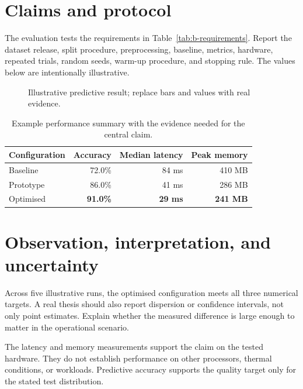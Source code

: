\section{Claims and protocol}
The evaluation tests the requirements in Table~\ref{tab:b-requirements}. Report the dataset release, split procedure, preprocessing, baseline, metrics, hardware, repeated trials, random seeds, warm-up procedure, and stopping rule. The values below are intentionally illustrative.

\begin{figure}[htbp]
\centering
\begin{minipage}{0.82\textwidth}
\end{minipage}
\caption{Illustrative predictive result; replace bars and values with real evidence.}
\label{fig:b-results}
\end{figure}

\begin{table}[htbp]
\centering
\caption{Example performance summary with the evidence needed for the central claim.}
\label{tab:b-results}
\begin{tabularx}{0.88\textwidth}{Yrrr}
\toprule
Configuration & Accuracy & Median latency & Peak memory\\
\midrule
Baseline & 72.0\% & 84 ms & 410 MB\\
Prototype & 86.0\% & 41 ms & 286 MB\\
Optimised & \textbf{91.0\%} & \textbf{29 ms} & \textbf{241 MB}\\
\bottomrule
\end{tabularx}
\end{table}

\section{Observation, interpretation, and uncertainty}
Across five illustrative runs, the optimised configuration meets all three numerical targets. A real thesis should also report dispersion or confidence intervals, not only point estimates. Explain whether the measured difference is large enough to matter in the operational scenario.

\begin{keypoint}
The latency and memory measurements support the claim on the tested hardware. They do not establish performance on other processors, thermal conditions, or workloads. Predictive accuracy supports the quality target only for the stated test distribution.
\end{keypoint}

